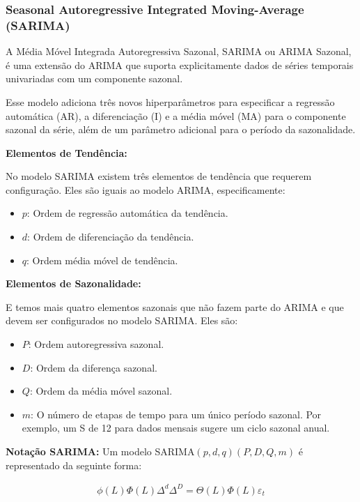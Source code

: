 \documentclass[11pt]{article}
\providecommand{\tightlist}{%
      \setlength{\itemsep}{0pt}\setlength{\parskip}{0pt}}
\begin{document}
    \hypertarget{seasonal-autoregressive-integrated-moving-average-sarima}{%
\subsubsection{Seasonal Autoregressive Integrated Moving-Average
(SARIMA)}\label{seasonal-autoregressive-integrated-moving-average-sarima}}

A Média Móvel Integrada Autoregressiva Sazonal, SARIMA ou ARIMA Sazonal,
é uma extensão do ARIMA que suporta explicitamente dados de séries
temporais univariadas com um componente sazonal.

Esse modelo adiciona três novos hiperparâmetros para especificar a
regressão automática (AR), a diferenciação (I) e a média móvel (MA) para
o componente sazonal da série, além de um parâmetro adicional para o
período da sazonalidade.

\textbf{Elementos de Tendência:}

No modelo SARIMA existem três elementos de tendência que requerem
configuração. Eles são iguais ao modelo ARIMA, especificamente:

\begin{itemize}
\tightlist
\item
  \(p\): Ordem de regressão automática da tendência.
\item
  \(d\): Ordem de diferenciação da tendência.
\item
  \(q\): Ordem média móvel de tendência.
\end{itemize}

\textbf{Elementos de Sazonalidade:}

E temos mais quatro elementos sazonais que não fazem parte do ARIMA e
que devem ser configurados no modelo SARIMA. Eles são:

\begin{itemize}
\tightlist
\item
  \(P\): Ordem autoregressiva sazonal.
\item
  \(D\): Ordem da diferença sazonal.
\item
  \(Q\): Ordem da média móvel sazonal.
\item
  \(m\): O número de etapas de tempo para um único período sazonal. Por
  exemplo, um S de 12 para dados mensais sugere um ciclo sazonal anual.
\end{itemize}

\textbf{Notação SARIMA:} Um modelo SARIMA\((p,d,q)(P,D,Q,m)\) é
representado da seguinte forma:

\[\begin{align*} 
\phi(L)\Phi(L)\Delta^d\Delta^D = \Theta(L)\Phi(L)\varepsilon_t
\end{align*}\]
\end{document}
